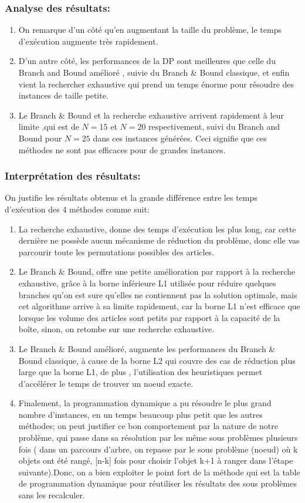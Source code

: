 \documentclass[12pt]{article}
\begin{document}
\subsubsection{Analyse des résultats:}
\begin{enumerate}
    \item On remarque d’un côté qu’en augmentant la taille du problème, le temps d'exécution augmente très rapidement.
    \item D’un autre côté, les performances de la DP sont meilleures que celle du Branch and Bound amélioré , suivie du Branch \& Bound classique, et enfin vient la rechercher exhaustive qui prend un temps énorme pour résoudre des instances de taille petite. 
    \item Le Branch \& Bound et la recherche exhaustive arrivent rapidement à leur limite ,qui est de \(N=15\) et \(N=20\) respectivement, suivi du Branch and Bound pour \(N=25\) dans ces instances générées. Ceci signifie que ces méthodes ne sont pas efficaces pour de grandes instances.
\end{enumerate}
\subsubsection{Interprétation des résultats:}
On justifie les résultats obtenus et la grande différence entre les temps d’exécution des 4 méthodes comme suit: 
\begin{enumerate}
    \item La recherche exhaustive, donne des temps d'exécution les plus long, car cette dernière ne possède aucun mécanisme de réduction du problème, donc elle vas parcourir toute les permutations possibles des articles.
    \item Le Branch \& Bound, offre une petite amélioration par rapport à la recherche exhaustive, grâce à la borne inférieure L1 utilisée pour réduire quelques branches qu’on est sure qu’elles ne contiennent pas la solution optimale, mais cet algorithme arrive à sa limite rapidement, car la borne L1 n’est efficace que lorsque les volume des articles sont petits par rapport à la capacité de la boîte, sinon, on retombe sur une recherche exhaustive.
    \item Le Branch \& Bound amélioré, augmente les performances du Branch \& Bound classique, à cause de la borne L2 qui couvre des cas de réduction plus large que la borne L1, de plus , l’utilisation des heuristiques permet d'accélérer le temps de trouver un noeud exacte.
    \item Finalement, la programmation dynamique a pu résoudre le plus grand nombre d’instances, en un temps beaucoup plus petit que les autres méthodes; on peut justifier ce bon comportement par la nature de notre problème, qui passe dans sa résolution par les même sous problèmes plusieurs fois ( dans un parcours d’arbre, on repasse par le sous problème (noeud) où k objets ont été rangé, [n-k] fois pour choisir l’objet k+1 à ranger dans l’étape suivante).Donc, on a bien exploiter le point fort de la méthode qui est la table de programmation dynamique pour réutiliser les résultats des sous problèmes sans les recalculer.
\end{enumerate}
\end{document}
